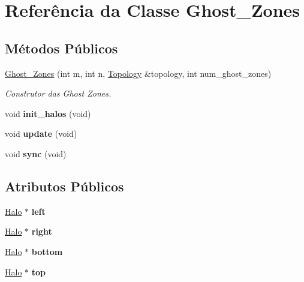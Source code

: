\hypertarget{classGhost__Zones}{
\section{Referência da Classe Ghost\_\-Zones}
\label{classGhost__Zones}
}
\subsection*{Métodos Públicos}
\begin{DoxyCompactItemize}
\item 
\hyperlink{classGhost__Zones_afabe1aca266df8a6997600b42f507f83}{Ghost\_\-Zones} (int m, int n, \hyperlink{classTopology}{Topology} \&topology, int num\_\-ghost\_\-zones)
\begin{DoxyCompactList}\small\item\em Construtor das Ghost Zones. \item\end{DoxyCompactList}\item 
\hypertarget{classGhost__Zones_a51333ce16990a9111841387991a83339}{
void {\bfseries init\_\-halos} (void)}
\label{classGhost__Zones_a51333ce16990a9111841387991a83339}

\item 
\hypertarget{classGhost__Zones_a67e907bca0f6dcefe1c5caae41e3740c}{
void {\bfseries update} (void)}
\label{classGhost__Zones_a67e907bca0f6dcefe1c5caae41e3740c}

\item 
\hypertarget{classGhost__Zones_a99d884e0cce340a79a16fd41a15c24d0}{
void {\bfseries sync} (void)}
\label{classGhost__Zones_a99d884e0cce340a79a16fd41a15c24d0}

\end{DoxyCompactItemize}
\subsection*{Atributos Públicos}
\begin{DoxyCompactItemize}
\item 
\hypertarget{classGhost__Zones_a00cb4da5a6bb10d855bdc65012bc1385}{
\hyperlink{classHalo}{Halo} $\ast$ {\bfseries left}}
\label{classGhost__Zones_a00cb4da5a6bb10d855bdc65012bc1385}

\item 
\hypertarget{classGhost__Zones_afef683ed6a12218caa0d1c9fd88033e2}{
\hyperlink{classHalo}{Halo} $\ast$ {\bfseries right}}
\label{classGhost__Zones_afef683ed6a12218caa0d1c9fd88033e2}

\item 
\hypertarget{classGhost__Zones_a92f70f6e09253c12996dbc8cf4064bb9}{
\hyperlink{classHalo}{Halo} $\ast$ {\bfseries bottom}}
\label{classGhost__Zones_a92f70f6e09253c12996dbc8cf4064bb9}

\item 
\hypertarget{classGhost__Zones_ae0bbbc81f8067f9b854fe35de1214031}{
\hyperlink{classHalo}{Halo} $\ast$ {\bfseries top}}
\label{classGhost__Zones_ae0bbbc81f8067f9b854fe35de1214031}

\end{DoxyCompactItemize}


